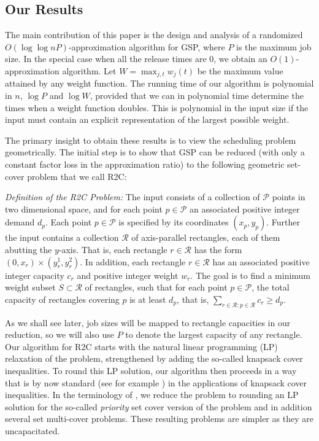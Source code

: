 \documentclass[11pt]{article}
\begin{document}
\subsection{Our Results}
The main contribution of this paper is the design and analysis of
a randomized $O(\log \log nP)$-approximation
algorithm for GSP,  where $P$ is the maximum job size. 
In the special case when all the release times are 0, we
obtain an  $O(1)$-approximation algorithm.
Let $W = \max_{j,t} w_j(t) $ be the maximum value attained by any weight function.
The running time of our algorithm is polynomial in $n$, $\log P$ and $\log W$,
provided that we can in polynomial time determine the times when a weight
function doubles. 
This is polynomial in the input size if the input 
must contain an explicit representation of the largest possible weight.




The primary insight to obtain these results is to view the scheduling problem geometrically.
The initial step is to show that GSP can be
reduced 
(with only a constant factor loss in the approximation ratio)
to the following geometric set-cover problem that we call R2C:

\bigskip

{\em Definition of the R2C Problem:}
The input consists of a collection of ${\mathcal P}$ points in two dimensional space,
and for each point $p \in {\mathcal P}$ an associated positive integer demand $d_p$.
Each point $p\in {\mathcal P}$ is specified by its coordinates $(x_p,y_p)$.
Further the input contains a collection ${\mathcal R}$ of axis-parallel rectangles, each of them abutting 
the $y$-axis. That is, each rectangle $r\in {\mathcal R}$ has the form  $(0,x_r) \times (y_r^1,y_r^2)$. 
In addition, each rectangle $r \in {\mathcal R}$ has an associated positive integer capacity $c_r$ 
and positive integer weight $w_r$.
The goal is to find a minimum weight subset $S \subset {\mathcal R}$ of rectangles, 
such that for each point $p \in {\mathcal P}$, the total capacity of rectangles covering $p$ is at least $d_p$,
that is, $ \sum_{r \in {\mathcal R} : p \in {\mathcal R}} c_r \geq d_p$.

\bigskip
As we shall see later, job sizes will be mapped to rectangle capacities in our reduction,
so we will also use $P$ to denote the largest capacity of any rectangle.
Our algorithm for R2C starts with the natural linear programming (LP) 
relaxation of the problem, 
strengthened by adding the so-called knapsack cover inequalities.
To round this LP solution, our algorithm then proceeds in a way that is by now standard (see for example \cite{CGK10}) in the applications of knapsack cover inequalities. In the terminology of \cite{CGK10}, we reduce the problem to rounding an LP solution for the so-called {\em priority} set cover version of the problem and in addition
several set multi-cover problems. These resulting problems are simpler as they are uncapacitated.
\end{document}
